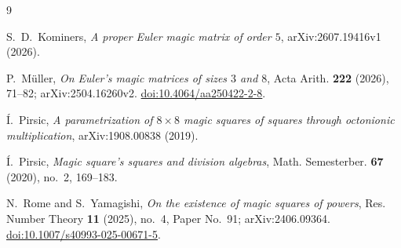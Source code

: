 \documentclass[11pt]{amsart}
\theoremstyle{plain}
\theoremstyle{definition}
\begin{document}
\begin{thebibliography}{9}

S.~D.~Kominers,
\emph{A proper Euler magic matrix of order $5$},
arXiv:2607.19416v1 (2026).

P.~M\"uller,
\emph{On Euler's magic matrices of sizes $3$ and $8$},
Acta Arith. \textbf{222} (2026), 71--82; arXiv:2504.16260v2.
\href{https://doi.org/10.4064/aa250422-2-8}{doi:10.4064/aa250422-2-8}.

\'I.~Pirsic,
\emph{A parametrization of $8\times8$ magic squares of squares through
octonionic multiplication},
arXiv:1908.00838 (2019).

\'I.~Pirsic,
\emph{Magic square's squares and division algebras},
Math. Semesterber. \textbf{67} (2020), no.~2, 169--183.

N.~Rome and S.~Yamagishi,
\emph{On the existence of magic squares of powers},
Res. Number Theory \textbf{11} (2025), no.~4, Paper No.~91;
arXiv:2406.09364.
\href{https://doi.org/10.1007/s40993-025-00671-5}{doi:10.1007/s40993-025-00671-5}.

\end{thebibliography}
\end{document}

